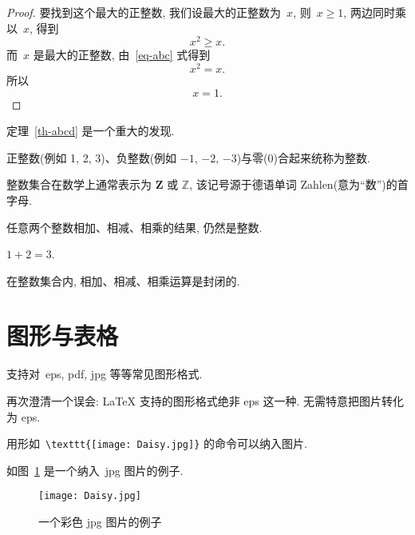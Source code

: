 \documentclass[forprint]{WHUBachelor}
\begin{document}
\begin{proof}
要找到这个最大的正整数, 我们设最大的正整数为~$x$, 则~$x \geqslant 1$, 两边同时乘以~$x$, 得到
\begin{equation}\label{eq-abc}
x^2 \geqslant x.
\end{equation}
而~$x$ 是最大的正整数, 由~\eqref{eq-abc} 式得到
\[
x^2 = x.
\]
所以
\begin{equation*}
x = 1.
\end{equation*}
\end{proof}

定理~\ref{th-abcd} 是一个重大的发现.

\begin{definition}[整数]
 正整数(例如 1, 2, 3)、负整数(例如 ${−1}$, $−2$, $−3$)与零(0)合起来统称为{\heiti 整数}.
\end{definition}

\begin{remark}
  整数集合在数学上通常表示为 $\mathbf{Z}$ 或 $\mathbb{Z}$, 该记号源于德语单词 Zahlen(意为``数'')的首字母.
\end{remark}

\begin{proposition}
任意两个整数相加、相减、相乘的结果, 仍然是整数.
\end{proposition}

\begin{example}
  $1+2=3$.
\end{example}

\begin{corollary}
   在整数集合内, 相加、相减、相乘运算是封闭的.
\end{corollary}

\section{图形与表格}

支持对~eps, pdf, jpg 等等常见图形格式.

再次\colorbox{red!45}{澄清一个误会}: \LaTeX{} 支持的图形格式绝非 eps 这一种. 无需特意把图片转化为 eps.

用形如~\verb|\texttt{[image: Daisy.jpg]}| 的命令可以纳入图片.

如图~\ref{fig:1} 是一个纳入~jpg 图片的例子.

\begin{figure}[ht]
\centering
  \texttt{[image: Daisy.jpg]}
  \caption{一个彩色 jpg 图片的例子}
  \label{fig:1}
\end{figure}
\end{document}
